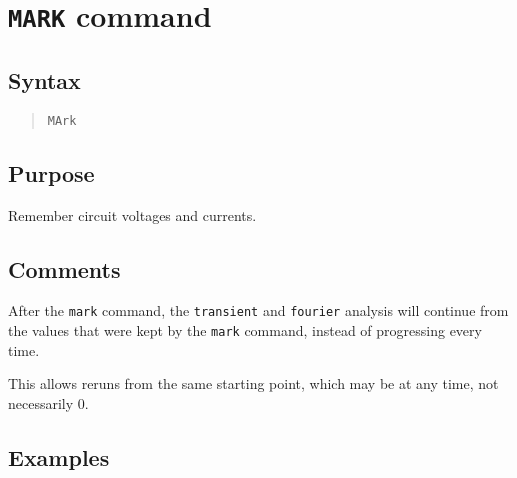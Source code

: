 \section{{\tt MARK} command}
\subsection{Syntax}
\begin{verse}
{\tt MArk}
\end{verse}
\subsection{Purpose}

Remember circuit voltages and currents.
\subsection{Comments}

After the {\tt mark} command, the {\tt transient} and {\tt fourier} analysis
will continue from the values that were kept by the {\tt mark} command,
instead of progressing every time.

This allows reruns from the same starting point, which may be at any time,
not necessarily 0.
\subsection{Examples}

